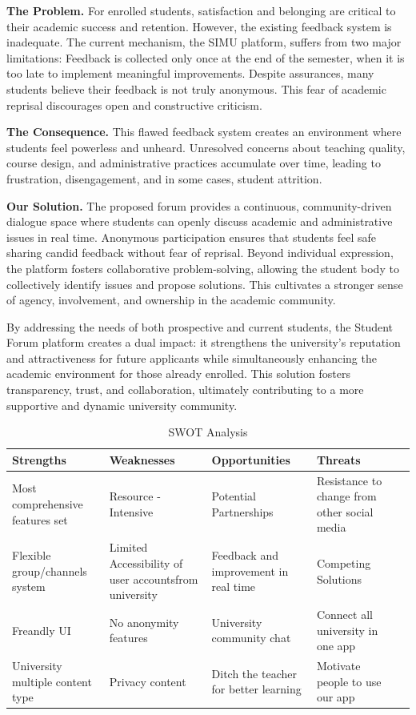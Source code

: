\textbf{The Problem.}  
For enrolled students, satisfaction and belonging are critical to their academic 
success and retention. However, the existing feedback system is inadequate. The 
current mechanism, the SIMU platform, suffers from two major limitations:
Feedback is collected only once at the end 
    of the semester, when it is too late to implement meaningful improvements.  
 Despite assurances, many students 
    believe their feedback is not truly anonymous. This fear of academic reprisal 
    discourages open and constructive criticism.  

\textbf{The Consequence.}  
This flawed feedback system creates an environment where students feel powerless 
and unheard. Unresolved concerns about teaching quality, course design, and 
administrative practices accumulate over time, leading to frustration, 
disengagement, and in some cases, student attrition.  

\textbf{Our Solution.}  
The proposed forum provides a continuous, community-driven dialogue space where 
students can openly discuss academic and administrative issues in real time. 
Anonymous participation ensures that students feel safe sharing candid feedback 
without fear of reprisal. Beyond individual expression, the platform fosters 
collaborative problem-solving, allowing the student body to collectively identify 
issues and propose solutions. This cultivates a stronger sense of agency, 
involvement, and ownership in the academic community.  

By addressing the needs of both prospective and current students, the Student 
Forum platform creates a dual impact: it strengthens the university’s reputation 
and attractiveness for future applicants while simultaneously enhancing the 
academic environment for those already enrolled. This solution fosters 
transparency, trust, and collaboration, ultimately contributing to a more 
supportive and dynamic university community.

\begin{table}[h!]
\centering
\caption{SWOT Analysis}
\begin{tabular}{|p{5cm}|p{3.5cm}|p{3.5cm}|p{3.5cm}|p{3.5cm}|}
\hline

\textbf{Strengths} & \textbf{Weaknesses} & \textbf{Opportunities} & \textbf{Threats}  \\
\hline
Most comprehensive features set& Resource - Intensive & Potential Partnerships & Resistance to change from other social media \\
\hline
Flexible group/channels system & Limited Accessibility of user accountsfrom university &  Feedback and improvement in real time & Competing Solutions   \\
\hline
Freandly UI& No anonymity features & University community chat & Connect all university in one app   \\
\hline 
University multiple content type& Privacy content & Ditch the teacher for better learning & Motivate people to use our app  \\
\hline
\end{tabular}
\end{table}

